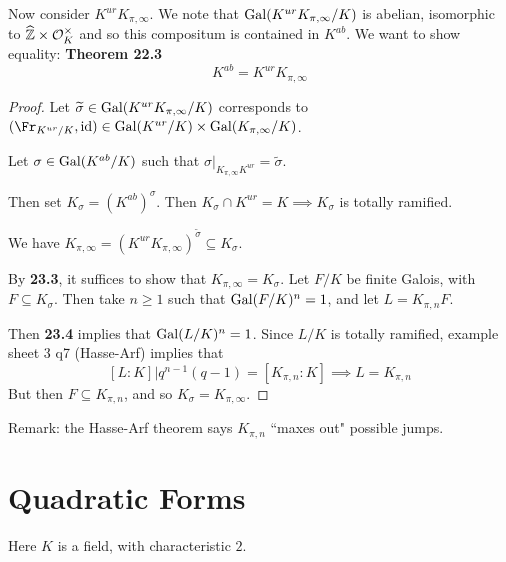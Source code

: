 \documentclass[10pt,a4paper]{article}
\begin{document}
Now consider $K^{ur}K_{\pi, \infty}$. We note that $\operatorname{Gal}(K^{ur}K_{\pi, \infty}/K)$ is abelian, isomorphic to $\widehat{\mathbb{Z}}\times \mathcal{O}_K^\times$ and so this compositum is contained in $K^{ab}$. We want to show equality:
\textbf{Theorem 22.3}
\[K^{ab} = K^{ur}K_{\pi,\infty}\]
\begin{proof}
  Let $\widetilde{\sigma} \in \operatorname{Gal}(K^{ur}K_{\pi,\infty}/K)$ corresponds to $(\Fr_{K^{ur}/K}, \id) \in \Gal(K^{ur}/K)\times \Gal(K_{\pi,\infty}/K)$.

  Let $\sigma \in \operatorname{Gal}(K^{ab}/K)$ such that $\sigma|_{K_{\pi,\infty}K^{ur}} = \tilde{\sigma}$.

  Then set $K_\sigma = (K^{ab})^\sigma$. Then $K_\sigma \cap K^{ur} = K \implies K_\sigma$ is totally ramified.

  We have $K_{\pi,\infty} = (K^{ur}K_{\pi,\infty})^{\tilde{\sigma}} \subseteq K_\sigma$.

  By \textbf{23.3}, it suffices to show that $K_{\pi, \infty} = K_\sigma$. Let $F/K$ be finite Galois, with $F \subseteq K_\sigma$. Then take $n \geq 1$ such that $\operatorname{Gal}(F/K)^n = 1$, and let $L = K_{\pi, n}F$.

  Then \textbf{23.4} implies that $\operatorname{Gal}(L/K)^n = 1$. Since $L/K$ is totally ramified, example sheet 3 q7 (Hasse-Arf) implies that
  \[ [L:K]| q^{n-1}(q-1) = [K_{\pi,n}:K] \implies L = K_{\pi,n}\]
  But then $F \subseteq K_{\pi,n}$, and so $K_\sigma = K_{\pi,\infty}$.
\end{proof}
Remark: the Hasse-Arf theorem says $K_{\pi,n}$ ``maxes out" possible jumps.

\section{Quadratic Forms}
Here $K$ is a field, with characteristic $2$.
\end{document}
